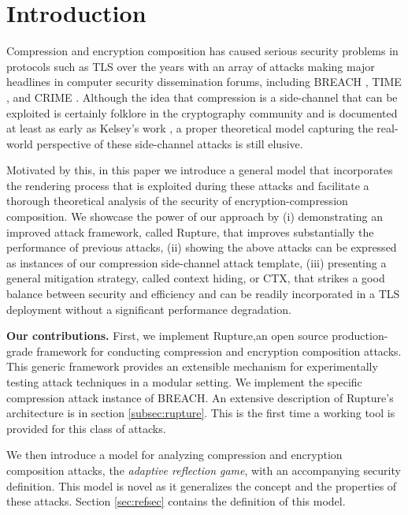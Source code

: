 \section{Introduction}\label{sec:prev}

Compression and encryption composition has caused serious security problems in
protocols such as TLS \cite{dierks2008tls} over the years with an array of
attacks making major headlines in computer security dissemination forums,
including BREACH \cite{gluck2013breach}, TIME \cite{be2013perfect}, and CRIME
\cite{duong2012crime}. Although the idea that compression is a side-channel that
can be exploited is certainly folklore in the cryptography community and is
documented at least as early as Kelsey's work \cite{kelsey2002compression}, a
proper theoretical model capturing the real-world perspective of these
side-channel attacks is still elusive.

Motivated by this, in this paper we introduce a general model that incorporates
the rendering process that is exploited during these attacks and facilitate a
thorough theoretical analysis of the security of encryption-compression
composition. We showcase the power of our approach by (i) demonstrating an
improved attack framework, called Rupture, that improves substantially the
performance of previous attacks, (ii) showing the above attacks can be expressed
as instances of our compression side-channel attack template, (iii) presenting a
general mitigation strategy, called context hiding, or CTX, that strikes a good balance between
security and efficiency and can be readily incorporated in a TLS deployment
without a significant performance degradation.


\noindent
\textbf{Our contributions.} First, we implement Rupture,\footnotemark[1] an
open source production-grade framework for conducting compression and encryption
composition attacks. This generic framework provides an extensible mechanism
for experimentally testing attack techniques in a modular setting. We implement
the specific compression attack instance of BREACH. An extensive
description of Rupture's architecture is in section \ref{subsec:rupture}.
This is the first time a working tool is provided for this class of attacks.

We then introduce a model for analyzing compression and encryption composition
attacks, the \textit{adaptive reflection game}, with an accompanying security
definition. This model is novel as it generalizes the concept and the properties
of these attacks. Section \ref{sec:refsec} contains the definition of this
model.

